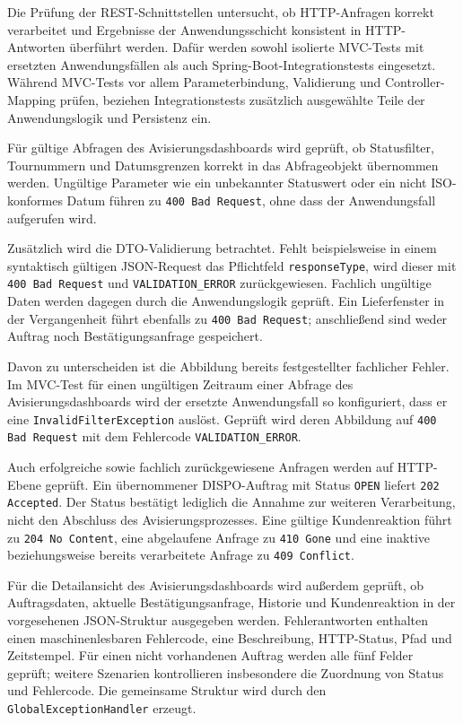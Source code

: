 Die Prüfung der REST-Schnittstellen untersucht, ob HTTP-Anfragen korrekt
verarbeitet und Ergebnisse der Anwendungsschicht konsistent in HTTP-Antworten
überführt werden. Dafür werden sowohl isolierte MVC-Tests mit ersetzten
Anwendungsfällen als auch Spring-Boot-Integrationstests eingesetzt. Während
MVC-Tests vor allem Parameterbindung, Validierung und Controller-Mapping prüfen,
beziehen Integrationstests zusätzlich ausgewählte Teile der Anwendungslogik und
Persistenz ein.

Für gültige Abfragen des Avisierungsdashboards wird geprüft, ob Statusfilter,
Tournummern und Datumsgrenzen korrekt in das Abfrageobjekt übernommen werden.
Ungültige Parameter wie ein unbekannter Statuswert oder ein nicht ISO-konformes
Datum führen zu \texttt{400 Bad Request}, ohne dass der Anwendungsfall
aufgerufen wird.

Zusätzlich wird die DTO-Validierung betrachtet. Fehlt beispielsweise in einem
syntaktisch gültigen JSON-Request das Pflichtfeld \texttt{responseType}, wird
dieser mit \texttt{400 Bad Request} und \texttt{VALIDATION\_ERROR}
zurückgewiesen. Fachlich ungültige Daten werden dagegen durch die
Anwendungslogik geprüft. Ein Lieferfenster in der Vergangenheit führt ebenfalls
zu \texttt{400 Bad Request}; anschließend sind weder Auftrag noch
Bestätigungsanfrage gespeichert.

Davon zu unterscheiden ist die Abbildung bereits festgestellter fachlicher
Fehler. Im MVC-Test für einen ungültigen Zeitraum einer Abfrage des
Avisierungsdashboards wird der ersetzte Anwendungsfall so konfiguriert, dass er
eine \texttt{InvalidFilterException} auslöst. Geprüft wird deren Abbildung auf
\texttt{400 Bad Request} mit dem Fehlercode \texttt{VALIDATION\_ERROR}.

Auch erfolgreiche sowie fachlich zurückgewiesene Anfragen werden auf HTTP-Ebene
geprüft. Ein übernommener DISPO-Auftrag mit Status \texttt{OPEN} liefert
\texttt{202 Accepted}. Der Status bestätigt lediglich die Annahme zur weiteren
Verarbeitung, nicht den Abschluss des Avisierungsprozesses. Eine gültige
Kundenreaktion führt zu \texttt{204 No Content}, eine abgelaufene Anfrage zu
\texttt{410 Gone} und eine inaktive beziehungsweise bereits verarbeitete
Anfrage zu \texttt{409 Conflict}.

Für die Detailansicht des Avisierungsdashboards wird außerdem geprüft, ob
Auftragsdaten, aktuelle Bestätigungsanfrage, Historie und Kundenreaktion in
der vorgesehenen JSON-Struktur ausgegeben werden. Fehlerantworten enthalten einen
maschinenlesbaren Fehlercode, eine Beschreibung, HTTP-Status, Pfad und
Zeitstempel. Für einen nicht vorhandenen Auftrag werden alle fünf Felder
geprüft; weitere Szenarien kontrollieren insbesondere die Zuordnung von Status
und Fehlercode. Die gemeinsame Struktur wird durch den
\texttt{GlobalExceptionHandler} erzeugt.

